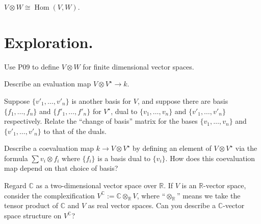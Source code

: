 \documentclass{homework}
\DeclareMathOperator{\Hom}{Hom}
\begin{document}
\vfill

\begin{problem}
  $V \otimes W \cong \Hom(V,W)$.
\end{problem}

\vfill

\section{Exploration.}

\begin{problem}
  Use P09 to define $V \otimes W$ for finite dimensional vector spaces.
\end{problem}

\vfill

\begin{problem}
  Describe an evaluation map $V \otimes V^\star \to k$.
\end{problem}

\vfill

\begin{problem}
  Suppose $\{ v'_1,\ldots, v'_n \}$ is another basis for $V$, and suppose there are basis $\{ f_1,\ldots,f_n\}$ and $\{ f'_1,\ldots,f'_n \}$ for $V^\star$, dual to $\{v_1,\ldots,v_n\}$ and $\{v'_1,\ldots,v'_n\}$ respectively.  Relate the ``change of basis'' matrix for the bases $\{v_1,\ldots,v_n\}$ and $\{v'_1,\ldots,v'_n\}$ to that of the duals.
\end{problem}

\vfill

\begin{problem}
  Describe a coevaluation map $k \to V \otimes V^\star$ by defining an element of $V \otimes V^\star$ via the formula $\sum v_i \otimes f_i$ where $\{ f_i \}$ is  a basis dual to $\{ v_i \}$.  How does this coevaluation map depend on that choice of basis?
\end{problem}

\vfill

\begin{problem}
  Regard $\mathbb{C}$ as a two-dimensional vector space over $\mathbb{R}$.  If $V$ is an $\mathbb{R}$-vector space, consider the complexification $V^{\mathbb{C}} := \mathbb{C} \otimes_{\mathbb{R}} V$, where ``$\otimes_{\mathbb{R}}$'' means we take the tensor product of $\mathbb{C}$ and $V$ as real vector spaces.  Can you describe a $\mathbb{C}$-vector space structure on $V^{\mathbb{C}}$?
\end{problem}

\vfill
\end{document}
